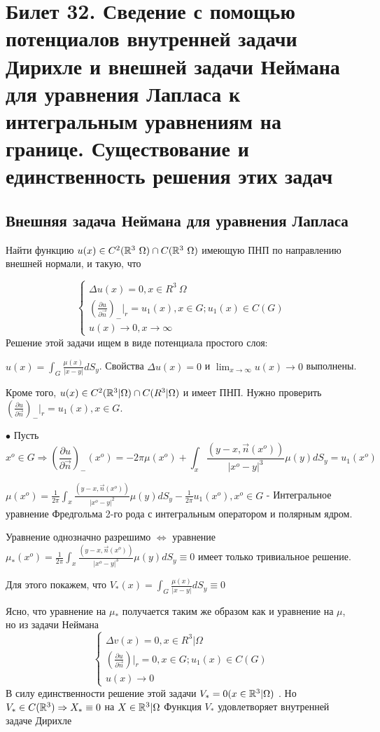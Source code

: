\section{Билет 32. Сведение с помощью потенциалов внутренней задачи Дирихле и внешней задачи Неймана для уравнения Лапласа к интегральным уравнениям на границе. Существование и единственность решения этих задач}

\subsection{Внешняя задача Неймана для уравнения Лапласа}

Найти функцию $u(x) \in C^2(\mathbb{R}^3 \ \Omega) \cap C(\mathbb{R}^3 \ \Omega)$ имеющую ПНП по направлению внешней нормали, и такую, что 

\begin{equation}
 \begin{cases}
 \Delta u(x) = 0, x \in R^3 \ \Omega
  \\
   (\frac{\partial u}{\partial \vec{n}})_{-}|_r = u_1(x), x \in G; u_1(x) \in C(G)
   \\
   u(x) \to 0, x \to \infty
 \end{cases}
\end{equation}
Решение этой задачи ищем в виде потенциала простого слоя: 

$u(x) = \int_G \frac{\mu(x)}{|x - y|} dS_y$. Свойства $\Delta u(x) = 0$ и $\lim_{x \to \infty} u(x) \to 0$ выполнены.

Кроме того, $u(x) \in C^2(\mathbb{R}^3 | \Omega) \cap C(R^3 | \Omega)$ и имеет ПНП. Нужно проверить $(\frac{\partial u}{\partial \vec{n}})_-|_r = u_1(x), x \in G$. 

$\bullet$ Пусть $$x^o \in G \Rightarrow (\frac{\partial u}{\partial \vec{n}})_{-}(x^o) = -2\pi \mu(x^o) + \int_x \frac{(y - x, \vec{n}(x^o))}{|x^o - y|^3}\mu(y)dS_y = u_1(x^o)$$

$\mu(x^o) = \frac{1}{2\pi}\int_x \frac{(y - x, \vec{n}(x^o))}{|x^o - y|^2}\mu(y)dS_y - \frac{1}{2\pi}u_1(x^o), x^o \in G $ - Интегральное уравнение Фредгольма 2-го рода с интегральным оператором и полярным ядром.

Уравнение однозначно разрешимо $\Leftrightarrow$ уравнение $\mu_*(x^o) = \frac{1}{2\pi}\int_x \frac{(y - x, \vec{n}(x^o))}{|x^o - y|^3}\mu(y)dS_y \equiv 0 $ имеет только тривиальное решение. 

Для этого покажем, что $V_*(x) = \int_G \frac{\mu(x)}{|x - y|}dS_y \equiv 0$

Ясно, что уравнение на $\mu_*$ получается таким же образом как и уравнение на $\mu$, но из задачи Неймана 
\begin{equation}
 \begin{cases}
 \Delta v(x) = 0, x \in R^3 | \Omega
  \\
   (\frac{\partial u}{\partial \vec{n}})|_r = 0, x \in G; u_1(x) \in C(G)
   \\
   u(x) \to 0
 \end{cases}
\end{equation}
В силу единственности решение этой задачи $V_* = 0 (x \in \mathbb{R}^3 | \Omega)$ . Но $V_* \in C(\mathbb{R}^3) \Rightarrow X_* \equiv 0$ на $X \in \mathbb{R}^3 | \Omega$ Функция $V_*$ удовлетворяет внутренней задаче Дирихле

